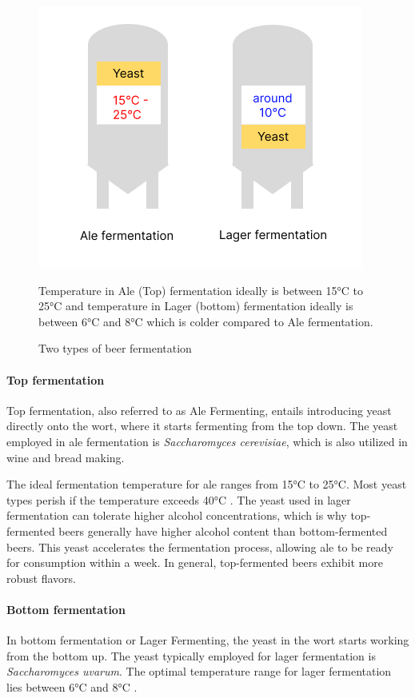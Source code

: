             \begin{figure}[h]
                \centering
                \includegraphics[scale=0.5]{images/beer_fermentation.png}
                \caption{Two types of beer fermentation}
                \small Temperature in Ale (Top) fermentation ideally is between 15°C to 25°C and temperature in Lager (bottom) fermentation ideally is between 6°C and 8°C which is colder compared to Ale fermentation\cite{viejo2019chemical}.
                \label{fig:intro:beer_fermentation}
            \end{figure}
                
            \paragraph*{Top fermentation}
                Top fermentation, also referred to as Ale Fermenting, entails introducing yeast directly onto the wort, where it starts fermenting from the top down. The yeast employed in ale fermentation is \textit{Saccharomyces cerevisiae}, which is also utilized in wine and bread making. 
                
                The ideal fermentation temperature for ale ranges from 15°C to 25°C. Most yeast types perish if the temperature exceeds 40°C \cite{viejo2019chemical}. The yeast used in lager fermentation can tolerate higher alcohol concentrations, which is why top-fermented beers generally have higher alcohol content than bottom-fermented beers. This yeast accelerates the fermentation process, allowing ale to be ready for consumption within a week. In general, top-fermented beers exhibit more robust flavors.

            \paragraph*{Bottom fermentation}
                In bottom fermentation or Lager Fermenting, the yeast in the wort starts working from the bottom up. The yeast typically employed for lager fermentation is \textit{Saccharomyces uvarum}. The optimal temperature range for lager fermentation lies between 6°C and 8°C \cite{viejo2019chemical}.

